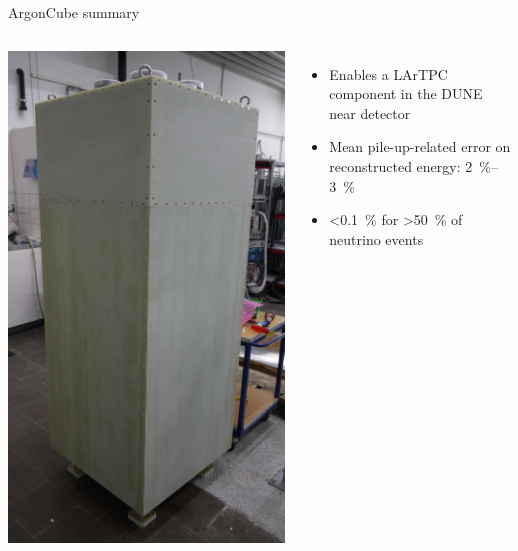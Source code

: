 \documentclass[]{beamer}
\newcommand*{\emphcol}{red}
\newcommand*{\AC}{{ArgonCube}}
\newcommand*{\dune}{{DUNE}}
\newcommand*{\lartpc}{{LArTPC}}
\begin{document}
\begin{frame}{\AC{} summary}
	\begin{columns}[c]
		\centering
		\includegraphics[width=.8\textheight, angle=90]{ac/2x2/module_real}
		\begin{itemize}
			\item {\color{\emphcol} Enables a \lartpc{} component in the \dune{} near detector}
			\item Mean pile-up-related error on reconstructed energy: \SIrange{2}{3}{\percent}
			\item \SI{<0.1}{\percent} for \SI{>50}{\percent} of neutrino events
		\end{itemize}
	\end{columns}
\end{frame}
\end{document}
